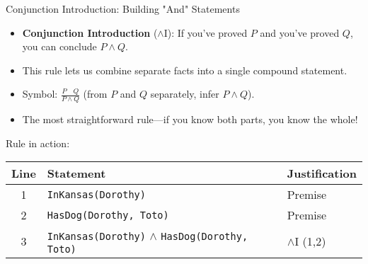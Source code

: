 \documentclass{beamer}
\begin{document}
	\begin{frame}{Conjunction Introduction: Building "And" Statements}
		\begin{itemize}
			\item \textbf{Conjunction Introduction} ($\land$I): If you've proved $P$ and you've proved $Q$, you can conclude $P \land Q$.
			\item This rule lets us combine separate facts into a single compound statement.
			\item Symbol: $\frac{P \quad Q}{P \land Q}$ (from $P$ and $Q$ separately, infer $P \land Q$).
			\item The most straightforward rule—if you know both parts, you know the whole!
		\end{itemize}
		
		\begin{example}
			\scriptsize{
			Rule in action:
			\begin{tabular}{|c|l|l|}
				\hline
				\textbf{Line} & \textbf{Statement} & \textbf{Justification} \\
				\hline
				1 & \texttt{InKansas(Dorothy)} & Premise \\
				2 & \texttt{HasDog(Dorothy, Toto)} & Premise \\
				3 & \texttt{InKansas(Dorothy)} $\land$ \texttt{HasDog(Dorothy, Toto)} & $\land$I (1,2) \\
				\hline
			\end{tabular}
		}
		\end{example}
	\end{frame}
	
	
	
\end{document}
